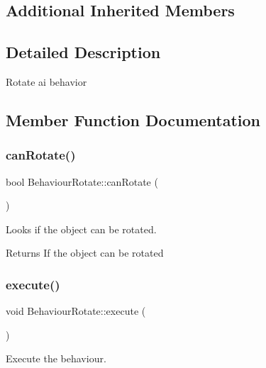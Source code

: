 \subsection*{Additional Inherited Members}


\subsection{Detailed Description}
Rotate ai behavior 



\subsection{Member Function Documentation}
\mbox{\label{class_behaviour_rotate_a93f1ef9eb3fe2ea8dfb49a4e435b48a5}} 
\subsubsection{\texorpdfstring{can\+Rotate()}{canRotate()}}
{\footnotesize\ttfamily bool Behaviour\+Rotate\+::can\+Rotate (\begin{DoxyParamCaption}{ }\end{DoxyParamCaption})}



Looks if the object can be rotated. 

\begin{DoxyReturn}{Returns}
If the object can be rotated
\end{DoxyReturn}
\mbox{\label{class_behaviour_rotate_aa01153f4a487813580ecb5d5145da47c}} 
\subsubsection{\texorpdfstring{execute()}{execute()}}
{\footnotesize\ttfamily void Behaviour\+Rotate\+::execute (\begin{DoxyParamCaption}{ }\end{DoxyParamCaption})\hspace{0.3cm}{\ttfamily [virtual]}}



Execute the behaviour. 



